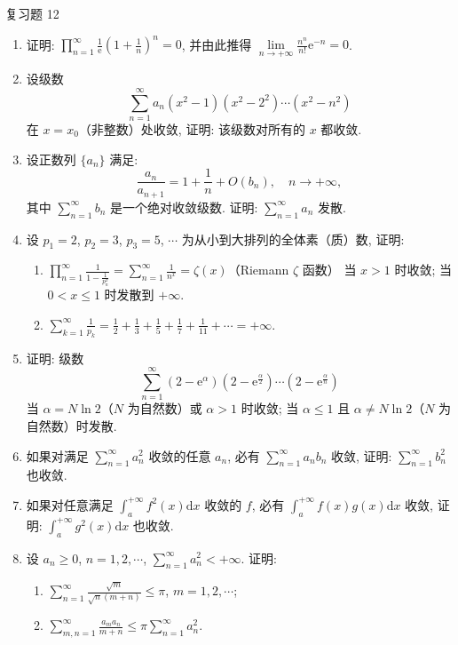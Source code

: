 \begin{exblock}{复习题 12}
\begin{enumerate}
  如果将条件中的“任意一个趋于 0 的数列”改为“任意一个单调减趋于 0 的数列”, 结论是否成立?
  \item 证明: $\prod_{n=1}^{\infty}\frac{1}{\mathrm{e}}\left(1+\frac{1}{n}\right)^{n}=0$, 并由此推得 $\lim\limits_{n\to+\infty}\frac{n^{n}}{n!}\mathrm{e}^{-n}=0$.
  \item 设级数
  \[
    \sum_{n=1}^{\infty}a_{n}(x^{2}-1)(x^{2}-2^{2})\cdots(x^{2}-n^{2})
\]
  在 $x=x_{0}$（非整数）处收敛, 证明: 该级数对所有的 $x$ 都收敛.
  \item 设正数列 $\{a_{n}\}$ 满足:
  \[
    \frac{a_{n}}{a_{n+1}}=1+\frac{1}{n}+O(b_{n}),\quad n\to+\infty,
\]
  其中 $\sum_{n=1}^{\infty}b_{n}$ 是一个绝对收敛级数. 证明: $\sum_{n=1}^{\infty}a_{n}$ 发散.
  \item 设 $p_{1}=2$, $p_{2}=3$, $p_{3}=5$, $\cdots$ 为从小到大排列的全体素（质）数, 证明:
  \begin{enumerate}
    \item $\displaystyle\prod_{n=1}^{\infty}\frac{1}{1-\frac{1}{p_{n}^{x}}}=\sum_{n=1}^{\infty}\frac{1}{n^{x}}=\zeta(x)$（Riemann $\zeta$ 函数）
    当 $x>1$ 时收敛; 当 $0<x\leqslant1$ 时发散到 $+\infty$.
    \item $\displaystyle\sum_{k=1}^{\infty}\frac{1}{p_{k}}=\frac{1}{2}+\frac{1}{3}+\frac{1}{5}+\frac{1}{7}+\frac{1}{11}+\cdots=+\infty$.
  \end{enumerate}
  \item 证明: 级数
  \[
    \sum_{n=1}^{\infty}(2-\mathrm{e}^{\alpha})\left(2-\mathrm{e}^{\frac{\alpha}{2}}\right)\cdots\left(2-\mathrm{e}^{\frac{\alpha}{n}}\right)
\]
  当 $\alpha=N\ln2$（$N$ 为自然数）或 $\alpha>1$ 时收敛; 当 $\alpha\leqslant1$ 且 $\alpha\neq N\ln2$（$N$ 为自然数）时发散.
  \item 如果对满足 $\sum_{n=1}^{\infty}a_{n}^{2}$ 收敛的任意 $a_{n}$, 必有 $\sum_{n=1}^{\infty}a_{n}b_{n}$ 收敛, 证明: $\sum_{n=1}^{\infty}b_{n}^{2}$ 也收敛.
  \item 如果对任意满足 $\int_{a}^{+\infty}f^{2}(x)\mathrm{d}x$ 收敛的 $f$, 必有 $\int_{a}^{+\infty}f(x)g(x)\mathrm{d}x$ 收敛, 证明: $\int_{a}^{+\infty}g^{2}(x)\mathrm{d}x$ 也收敛.
  \item 设 $a_{n}\geqslant0$, $n=1,2,\cdots$, $\sum_{n=1}^{\infty}a_{n}^{2}<+\infty$. 证明:
  \begin{enumerate}
    \item $\displaystyle\sum_{n=1}^{\infty}\frac{\sqrt{m}}{\sqrt{n}(m+n)}\leqslant\pi$, $m=1,2,\cdots$;
    \item $\displaystyle\sum_{m,n=1}^{\infty}\frac{a_{m}a_{n}}{m+n}\leqslant\pi\sum_{n=1}^{\infty}a_{n}^{2}$.

\end{enumerate}
\end{enumerate}
\end{exblock}
